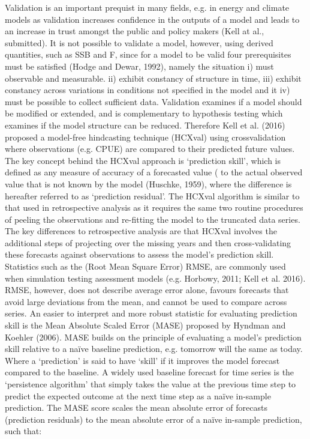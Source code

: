 Validation is an important prequist in many fields, e.g. in energy and climate models as validation increases confidence in the outputs of a model and leads to an increase in trust amongst the public and policy makers (Kell at al., submitted). It is not possible to validate a model, however, using derived quantities, such as SSB and F, since for a model to be valid four prerequisites must be satisfied (Hodge and Dewar, 1992), namely the situation i) must observable and measurable. ii) exhibit constancy of structure in time, iii) exhibit constancy across variations in conditions not specified in the model and it iv) must be possible to collect sufficient data. Validation examines if a model should be modified or extended, and is complementary to hypothesis testing which examines if the model structure can be reduced. Therefore Kell et al. (2016) proposed a model-free hindcasting technique (HCXval) using crossvalidation where observations (e.g. CPUE) are compared to their predicted future values. The key concept behind the HCXval approach is ‘prediction skill’, which is defined as any measure of accuracy of a forecasted value ( to the actual observed value that is  not known by the model (Huschke, 1959), where the difference  is hereafter referred to as ‘prediction residual’. The HCXval algorithm is similar to that used in retrospective analysis as it requires the same two routine procedures of peeling the observations and re-fitting the model to the truncated data series. The key differences to retrospective analysis are that HCXval involves the additional steps of projecting over the missing years and then cross-validating these forecasts against observations to assess the model’s prediction skill.
Statistics such as the (Root Mean Square Error) RMSE, are commonly used when simulation testing assessment models (e.g. Horbowy, 2011; Kell et al. 2016). RMSE, however, does not describe average error alone, favours forecasts that avoid large deviations from the mean, and cannot be used to compare across series. An easier to interpret and more robust statistic for evaluating prediction skill is the Mean Absolute Scaled Error (MASE) proposed by Hyndman and Koehler (2006). MASE builds on the principle of evaluating a model’s prediction skill relative to a naïve baseline prediction, e.g. tomorrow will the same as today. Where a ‘prediction’ is said to have ‘skill’ if it improves the model forecast compared to the baseline. A widely used baseline forecast for time series is the ‘persistence algorithm’ that simply takes the value at the previous time step to predict the expected outcome at the next time step as a naïve in-sample prediction. The MASE score scales the mean absolute error of forecasts (prediction residuals) to the mean absolute error of a naïve in-sample prediction, such that:

